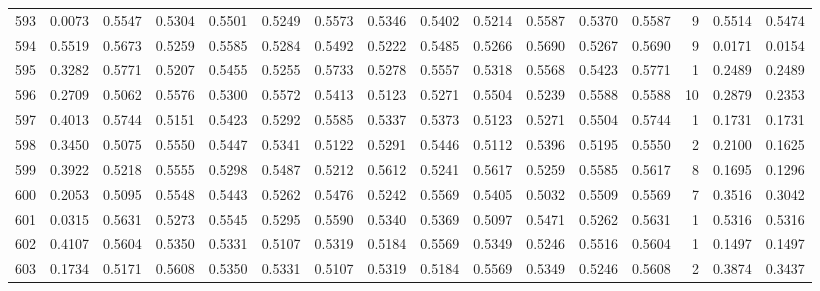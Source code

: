 \begin{tabular}{lrrrrrrrrrrrrrrr}
593 &      0.0073 &  0.5547 &  0.5304 &  0.5501 &  0.5249 &  0.5573 &  0.5346 &  0.5402 &  0.5214 &  0.5587 &   0.5370 &     0.5587 &      9 &                    0.5514 &                     0.5474 \\
594 &      0.5519 &  0.5673 &  0.5259 &  0.5585 &  0.5284 &  0.5492 &  0.5222 &  0.5485 &  0.5266 &  0.5690 &   0.5267 &     0.5690 &      9 &                    0.0171 &                     0.0154 \\
595 &      0.3282 &  0.5771 &  0.5207 &  0.5455 &  0.5255 &  0.5733 &  0.5278 &  0.5557 &  0.5318 &  0.5568 &   0.5423 &     0.5771 &      1 &                    0.2489 &                     0.2489 \\
596 &      0.2709 &  0.5062 &  0.5576 &  0.5300 &  0.5572 &  0.5413 &  0.5123 &  0.5271 &  0.5504 &  0.5239 &   0.5588 &     0.5588 &     10 &                    0.2879 &                     0.2353 \\
597 &      0.4013 &  0.5744 &  0.5151 &  0.5423 &  0.5292 &  0.5585 &  0.5337 &  0.5373 &  0.5123 &  0.5271 &   0.5504 &     0.5744 &      1 &                    0.1731 &                     0.1731 \\
598 &      0.3450 &  0.5075 &  0.5550 &  0.5447 &  0.5341 &  0.5122 &  0.5291 &  0.5446 &  0.5112 &  0.5396 &   0.5195 &     0.5550 &      2 &                    0.2100 &                     0.1625 \\
599 &      0.3922 &  0.5218 &  0.5555 &  0.5298 &  0.5487 &  0.5212 &  0.5612 &  0.5241 &  0.5617 &  0.5259 &   0.5585 &     0.5617 &      8 &                    0.1695 &                     0.1296 \\
600 &      0.2053 &  0.5095 &  0.5548 &  0.5443 &  0.5262 &  0.5476 &  0.5242 &  0.5569 &  0.5405 &  0.5032 &   0.5509 &     0.5569 &      7 &                    0.3516 &                     0.3042 \\
601 &      0.0315 &  0.5631 &  0.5273 &  0.5545 &  0.5295 &  0.5590 &  0.5340 &  0.5369 &  0.5097 &  0.5471 &   0.5262 &     0.5631 &      1 &                    0.5316 &                     0.5316 \\
602 &      0.4107 &  0.5604 &  0.5350 &  0.5331 &  0.5107 &  0.5319 &  0.5184 &  0.5569 &  0.5349 &  0.5246 &   0.5516 &     0.5604 &      1 &                    0.1497 &                     0.1497 \\
603 &      0.1734 &  0.5171 &  0.5608 &  0.5350 &  0.5331 &  0.5107 &  0.5319 &  0.5184 &  0.5569 &  0.5349 &   0.5246 &     0.5608 &      2 &                    0.3874 &                     0.3437 \\

\end{tabular}
